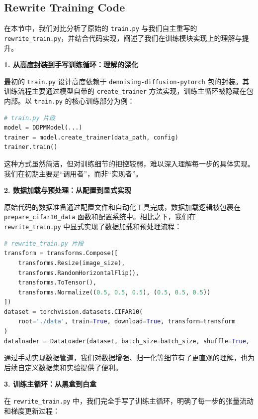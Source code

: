 \documentclass{ctexart}
\begin{document}
\subsection{Rewrite Training Code}
\noindent
在本节中，我们对比分析了原始的 \texttt{train.py} 与我们自主重写的 \texttt{rewrite\_train.py}，并结合代码实现，阐述了我们在训练模块实现上的理解与提升。

\vspace{0.5em}
\noindent
\textbf{1. 从高度封装到手写训练循环：理解的深化}

最初的 \texttt{train.py} 设计高度依赖于 \texttt{denoising-diffusion-pytorch} 包的封装。其训练流程主要通过模型自带的 \texttt{create\_trainer} 方法实现，训练主循环被隐藏在包内部。以 \texttt{train.py} 的核心训练部分为例：

\begin{lstlisting}[language=python]
# train.py 片段
model = DDPMModel(...)
trainer = model.create_trainer(data_path, config)
trainer.train()
\end{lstlisting}

这种方式虽然简洁，但对训练细节的把控较弱，难以深入理解每一步的具体实现。我们在初期主要是“调用者”，而非“实现者”。

\vspace{0.5em}
\noindent
\textbf{2. 数据加载与预处理：从配置到显式实现}

原始代码的数据准备通过配置文件和自动化工具完成，数据加载逻辑被包裹在 \texttt{prepare\_cifar10\_data} 函数和配置系统中。相比之下，我们在 \texttt{rewrite\_train.py} 中显式实现了数据加载和预处理流程：

\begin{lstlisting}[language=python]
# rewrite_train.py 片段
transform = transforms.Compose([
    transforms.Resize(image_size),
    transforms.RandomHorizontalFlip(),
    transforms.ToTensor(),
    transforms.Normalize((0.5, 0.5, 0.5), (0.5, 0.5, 0.5))
])
dataset = torchvision.datasets.CIFAR10(
    root='./data', train=True, download=True, transform=transform
)
dataloader = DataLoader(dataset, batch_size=batch_size, shuffle=True, ...)
\end{lstlisting}

通过手动实现数据管道，我们对数据增强、归一化等细节有了更直观的理解，也为后续自定义数据集和实验提供了便利。

\vspace{0.5em}
\noindent
\textbf{3. 训练主循环：从黑盒到白盒}

在 \texttt{rewrite\_train.py} 中，我们完全手写了训练主循环，明确了每一步的张量流动和梯度更新过程：
\end{document}
